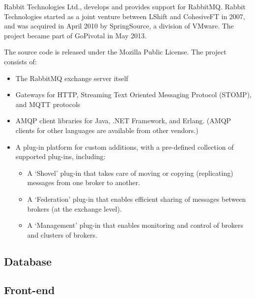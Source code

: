 \documentclass[12pt]{article}
\begin{document}
Rabbit Technologies Ltd., develops and provides support for RabbitMQ. Rabbit Technologies started as a joint venture between LShift and CohesiveFT in 2007, and was acquired in April 2010 by SpringSource, a division of VMware. The project became part of GoPivotal in May 2013.

The source code is released under the Mozilla Public License. The project consists of:
\begin{itemize}
    
    \item The RabbitMQ exchange server itself

    \item Gateways for HTTP, Streaming Text Oriented Messaging Protocol (STOMP), and MQTT protocols

    \item  AMQP client libraries for Java, .NET Framework, and Erlang. (AMQP clients for other languages are available from other vendors.)

    \item A plug-in platform for custom additions, with a pre-defined collection of supported plug-ins, including:

        \begin{itemize}
        
            \item A `Shovel' plug-in that takes care of moving or copying (replicating) messages from one broker to another.

            \item A `Federation' plug-in that enables efficient sharing of messages between brokers (at the exchange level).

            \item A `Management' plug-in that enables monitoring and control of brokers and clusters of brokers.~\cite{wiki:rabbitmq}

        \end{itemize}
\end{itemize}

\subsection{Database}

\subsection{Front-end}
\end{document}
